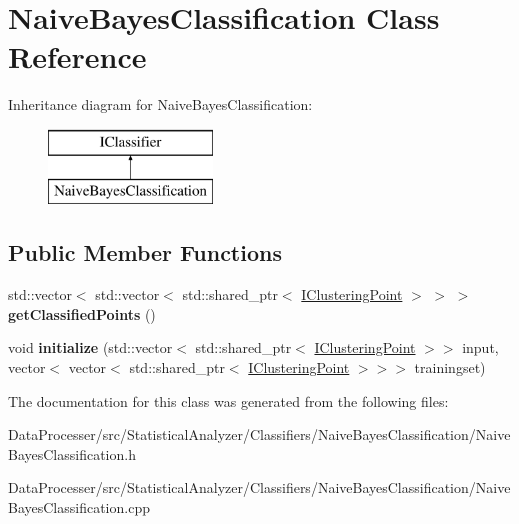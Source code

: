 \hypertarget{classNaiveBayesClassification}{}\section{Naive\+Bayes\+Classification Class Reference}
\label{classNaiveBayesClassification}
Inheritance diagram for Naive\+Bayes\+Classification\+:\begin{figure}[H]
\begin{center}
\leavevmode
\includegraphics[height=2.000000cm]{classNaiveBayesClassification}
\end{center}
\end{figure}
\subsection*{Public Member Functions}
\begin{DoxyCompactItemize}
\item 
\mbox{\label{classNaiveBayesClassification_a3d6e4ab088b7cb6a310270e5b6fc86ae}} 
std\+::vector$<$ std\+::vector$<$ std\+::shared\+\_\+ptr$<$ \hyperlink{classIClusteringPoint}{I\+Clustering\+Point} $>$ $>$ $>$ {\bfseries get\+Classified\+Points} ()
\item 
\mbox{\label{classNaiveBayesClassification_a17cb800221babf87be8b188b25de198b}} 
void {\bfseries initialize} (std\+::vector$<$ std\+::shared\+\_\+ptr$<$ \hyperlink{classIClusteringPoint}{I\+Clustering\+Point} $>$$>$ input, vector$<$ vector$<$ std\+::shared\+\_\+ptr$<$ \hyperlink{classIClusteringPoint}{I\+Clustering\+Point} $>$$>$$>$ trainingset)
\end{DoxyCompactItemize}


The documentation for this class was generated from the following files\+:\begin{DoxyCompactItemize}
\item 
Data\+Processer/src/\+Statistical\+Analyzer/\+Classifiers/\+Naive\+Bayes\+Classification/Naive\+Bayes\+Classification.\+h\item 
Data\+Processer/src/\+Statistical\+Analyzer/\+Classifiers/\+Naive\+Bayes\+Classification/Naive\+Bayes\+Classification.\+cpp\end{DoxyCompactItemize}
